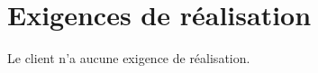 \documentclass{../res/univ-projet}
\begin{document}
\section{Exigences de réalisation}

Le client n'a aucune exigence de réalisation.

\end{document}

